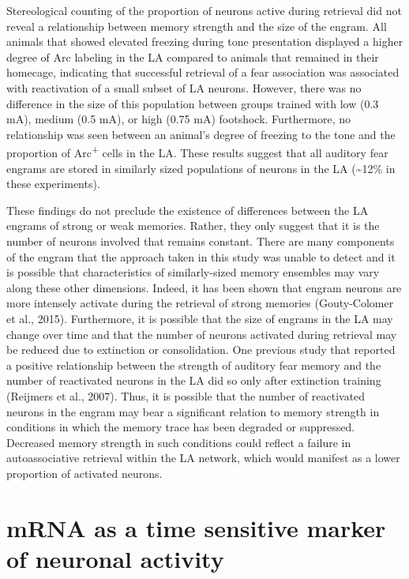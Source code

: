 \documentclass[12pt,a4paperpaper,]{report}
\begin{document}
Stereological counting of the proportion of neurons active during
retrieval did not reveal a relationship between memory strength and the
size of the engram. All animals that showed elevated freezing during
tone presentation displayed a higher degree of Arc labeling in the LA
compared to animals that remained in their homecage, indicating that
successful retrieval of a fear association was associated with
reactivation of a small subset of LA neurons. However, there was no
difference in the size of this population between groups trained with
low (0.3 mA), medium (0.5 mA), or high (0.75 mA) footshock. Furthermore,
no relationship was seen between an animal's degree of freezing to the
tone and the proportion of Arc\textsuperscript{+} cells in the LA. These
results suggest that all auditory fear engrams are stored in similarly
sized populations of neurons in the LA (\textasciitilde{}12\% in these
experiments).

These findings do not preclude the existence of differences between the
LA engrams of strong or weak memories. Rather, they only suggest that it
is the number of neurons involved that remains constant. There are many
components of the engram that the approach taken in this study was
unable to detect and it is possible that characteristics of
similarly-sized memory ensembles may vary along these other dimensions.
Indeed, it has been shown that engram neurons are more intensely
activate during the retrieval of strong memories (Gouty-Colomer et al.,
2015). Furthermore, it is possible that the size of engrams in the LA
may change over time and that the number of neurons activated during
retrieval may be reduced due to extinction or consolidation. One
previous study that reported a positive relationship between the
strength of auditory fear memory and the number of reactivated neurons
in the LA did so only after extinction training (Reijmers et al., 2007).
Thus, it is possible that the number of reactivated neurons in the
engram may bear a significant relation to memory strength in conditions
in which the memory trace has been degraded or suppressed. Decreased
memory strength in such conditions could reflect a failure in
autoassociative retrieval within the LA network, which would manifest as
a lower proportion of activated neurons.

\section{mRNA as a time sensitive marker of neuronal
activity}\label{mrna-as-a-time-sensitive-marker-of-neuronal-activity}
\end{document}
